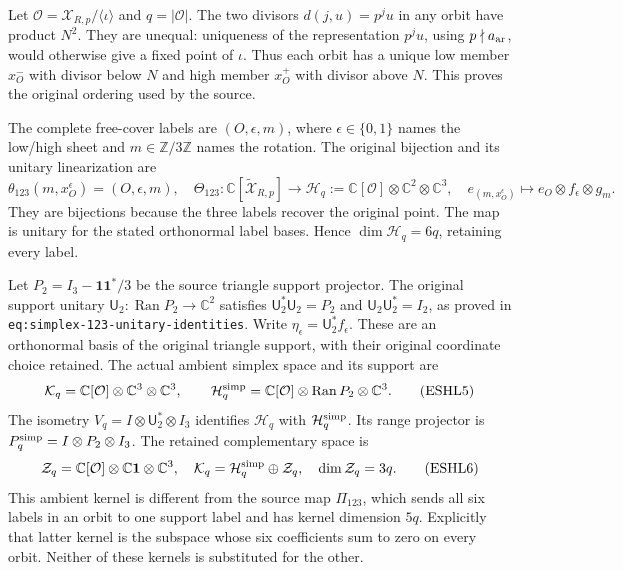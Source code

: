 \documentclass[
  10pt,
  a4paper,
]{article}
\begin{document}
Let \(\mathcal O=\mathcal X_{R,p}/\langle\iota\rangle\) and
\(q=|\mathcal O|\). The two divisors \(d(j,u)=p^ju\) in any orbit have
product \(N^2\). They are unequal: uniqueness of the representation
\(p^ju\), using \(p\nmid a_{\rm ar}\), would otherwise give a fixed
point of \(\iota\). Thus each orbit has a unique low member \(x_O^-\)
with divisor below \(N\) and high member \(x_O^+\) with divisor above
\(N\). This proves the original ordering used by the source.

The complete free-cover labels are \((O,\epsilon,m)\), where
\(\epsilon\in\{0,1\}\) names the low/high sheet and
\(m\in\mathbb Z/3\mathbb Z\) names the rotation. The original bijection
and its unitary linearization are \[
\theta_{123}(m,x_O^\epsilon)=(O,\epsilon,m),
\quad
\Theta_{123}:\mathbb C[\widetilde{\mathcal X}_{R,p}]
\longrightarrow \mathcal H_q:=\mathbb C[\mathcal O]\otimes\mathbb C^2\otimes\mathbb C^3,
\quad e_{(m,x_O^\epsilon)}\mapsto e_O\otimes f_\epsilon\otimes g_m.
\tag{ESHL4}
\] They are bijections because the three labels recover the original
point. The map is unitary for the stated orthonormal label bases. Hence
\(\dim\mathcal H_q=6q\), retaining every label.

Let \(P_2=I_3-\mathbf1\mathbf1^*/3\) be the source triangle support
projector. The original support unitary
\(\mathsf U_2:\operatorname{Ran}P_2\to\mathbb C^2\) satisfies
\(\mathsf U_2^*\mathsf U_2=P_2\) and \(\mathsf U_2\mathsf U_2^*=I_2\),
as proved in \texttt{eq:\allowbreak{}simplex-\allowbreak{}123-\allowbreak{}unitary-\allowbreak{}identities}. Write
\(\eta_\epsilon=\mathsf U_2^*f_\epsilon\). These are an orthonormal
basis of the original triangle support, with their original coordinate
choice retained. The actual ambient simplex space and its support are \[
\mathcal K_q=\mathbb C[\mathcal O]\otimes\mathbb C^3\otimes\mathbb C^3,
\qquad
\mathcal H_q^{\rm simp}=\mathbb C[\mathcal O]\otimes\operatorname{Ran}P_2\otimes\mathbb C^3.
\tag{ESHL5}
\] The isometry \(V_q=I\otimes\mathsf U_2^*\otimes I_3\) identifies
\(\mathcal H_q\) with \(\mathcal H_q^{\rm simp}\). Its range projector
is \(P_q^{\rm simp}=I\otimes P_2\otimes I_3\). The retained
complementary space is \[
\mathcal Z_q=\mathbb C[\mathcal O]\otimes\mathbb C\mathbf1\otimes\mathbb C^3,
\quad\mathcal K_q=\mathcal H_q^{\rm simp}\oplus\mathcal Z_q,
\quad\dim\mathcal Z_q=3q.
\tag{ESHL6}
\] This ambient kernel is different from the source map \(\Pi_{123}\),
which sends all six labels in an orbit to one support label and has
kernel dimension \(5q\). Explicitly that latter kernel is the subspace
whose six coefficients sum to zero on every orbit. Neither of these
kernels is substituted for the other.
\end{document}
